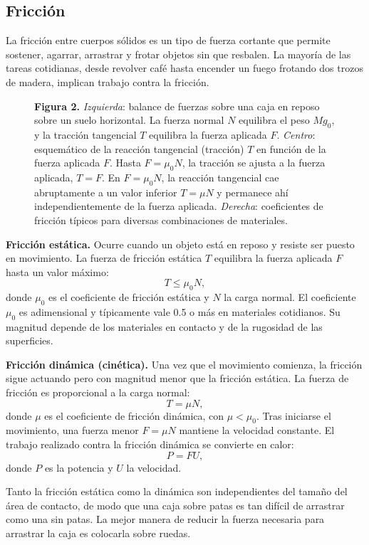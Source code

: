 \subsection{Fricción}

La fricción entre cuerpos sólidos es un tipo de fuerza cortante que permite sostener, agarrar, arrastrar y frotar objetos sin que resbalen. La mayoría de las tareas cotidianas, desde revolver café hasta encender un fuego frotando dos trozos de madera, implican trabajo contra la fricción.

\begin{figure}[H]
\centering

\par\medskip
\textbf{Figura 2.} \emph{Izquierda}: balance de fuerzas sobre una caja en reposo sobre un suelo horizontal. La fuerza normal $N$ equilibra el peso $Mg_0$, y la tracción tangencial $T$ equilibra la fuerza aplicada $F$. \emph{Centro}: esquemático de la reacción tangencial (tracción) $T$ en función de la fuerza aplicada $F$. Hasta $F = \mu_0 N$, la tracción se ajusta a la fuerza aplicada, $T = F$. En $F = \mu_0 N$, la reacción tangencial cae abruptamente a un valor inferior $T = \mu N$ y permanece ahí independientemente de la fuerza aplicada. \emph{Derecha}: coeficientes de fricción típicos para diversas combinaciones de materiales.
\end{figure}

\textbf{Fricción estática.} Ocurre cuando un objeto está en reposo y resiste ser puesto en movimiento. La fuerza de fricción estática $T$ equilibra la fuerza aplicada $F$ hasta un valor máximo:
$$ T \le \mu_0 N, $$
donde $\mu_0$ es el coeficiente de fricción estática y $N$ la carga normal. El coeficiente $\mu_0$ es adimensional y típicamente vale 0.5 o más en materiales cotidianos. Su magnitud depende de los materiales en contacto y de la rugosidad de las superficies.

\textbf{Fricción dinámica (cinética).} Una vez que el movimiento comienza, la fricción sigue actuando pero con magnitud menor que la fricción estática. La fuerza de fricción es proporcional a la carga normal:
$$ T = \mu N, $$
donde $\mu$ es el coeficiente de fricción dinámica, con $\mu < \mu_0$. Tras iniciarse el movimiento, una fuerza menor $F = \mu N$ mantiene la velocidad constante. El trabajo realizado contra la fricción dinámica se convierte en calor:
$$ P = FU, $$
donde $P$ es la potencia y $U$ la velocidad.

Tanto la fricción estática como la dinámica son independientes del tamaño del área de contacto, de modo que una caja sobre patas es tan difícil de arrastrar como una sin patas. La mejor manera de reducir la fuerza necesaria para arrastrar la caja es colocarla sobre ruedas.

